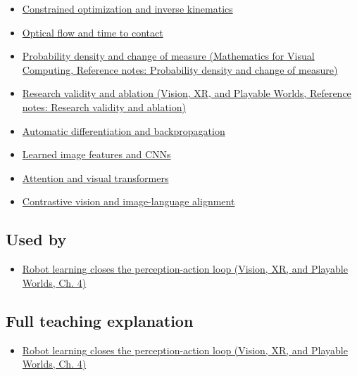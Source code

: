 \begin{itemize}
\tightlist
\item
  \hyperref[appendix-29f4bea4c2bb]{Constrained optimization and inverse kinematics}
\item
  \hyperref[appendix-e2e73f8cd93e]{Optical flow and time to contact}
\item
  \href{../02-Mathematics-for-Visual-Computing/main.pdf\#nameddest=appendix-4815cd87ab8b}{Probability density and change of measure (Mathematics for Visual Computing, Reference notes: Probability density and change of measure)}
\item
  \href{../07-Vision-XR-and-Playable-Worlds/main.pdf\#nameddest=appendix-65788587ef78}{Research validity and ablation (Vision, XR, and Playable Worlds, Reference notes: Research validity and ablation)}
\item
  \hyperref[appendix-40df0855b4a7]{Automatic differentiation and backpropagation}
\item
  \hyperref[appendix-47c51ea026fb]{Learned image features and CNNs}
\item
  \hyperref[appendix-a9d5dfdd164a]{Attention and visual transformers}
\item
  \hyperref[appendix-772f1fd96148]{Contrastive vision and image-language alignment}
\end{itemize}

\subsection{Used by}\label{appendix-b0c42da325f1-used-by}

\begin{itemize}
\tightlist
\item
  \href{../07-Vision-XR-and-Playable-Worlds/main.pdf\#nameddest=04-visual-computing-ii-ch034-robot-learning-closes-the-perception-action-loop}{Robot learning closes the perception-action loop (Vision, XR, and Playable Worlds, Ch. 4)}
\end{itemize}

\subsection{Full teaching explanation}\label{appendix-b0c42da325f1-full-teaching-explanation}

\begin{itemize}
\tightlist
\item
  \href{../07-Vision-XR-and-Playable-Worlds/main.pdf\#nameddest=04-visual-computing-ii-ch034-robot-learning-closes-the-perception-action-loop}{Robot learning closes the perception-action loop (Vision, XR, and Playable Worlds, Ch. 4)}
\end{itemize}

